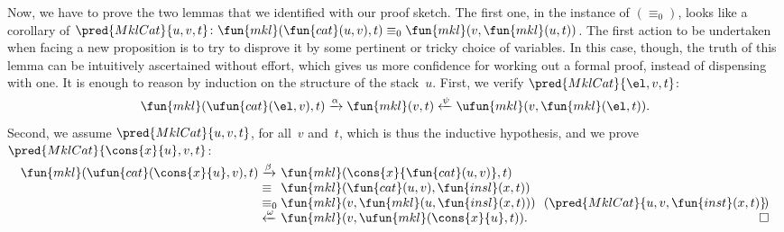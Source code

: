 Now, we have to prove the two lemmas that we identified with our proof
sketch. The first one, in the instance of \((\equiv_0)\), looks like a
corollary of \(\pred{MklCat}{u,v,t}
\colon \fun{mkl}(\fun{cat}(u,v),t) \equiv_0
\fun{mkl}(v,\fun{mkl}(u,t))\). The first action to be undertaken when
facing a new proposition is to try to disprove it by some pertinent or
tricky choice of variables. In this case, though, the truth of this
lemma can be intuitively ascertained without effort, which gives us
more confidence for working out a formal proof, instead of dispensing
with one. It is enough to reason by induction on the structure of the
stack~\(u\). First, we verify \(\pred{MklCat}{\el,v,t}\):
\begin{equation*}
\fun{mkl}(\ufun{cat}(\el,v),t)
  \xrightarrow{\smash{\alpha}} \fun{mkl}(v,t)
  \xleftarrow{\smash{\psi}} \ufun{mkl}(v,\fun{mkl}(\el,t)).
\end{equation*}
Second, we assume \(\pred{MklCat}{u,v,t}\), for all~\(v\) and~\(t\),
which is thus the inductive hypothesis, and we prove
\(\pred{MklCat}{\cons{x}{u},v,t}\):
\begin{equation*}
  \begin{array}{@{}r@{\;}l@{\;}l@{\quad}r@{}}
  \fun{mkl}(\ufun{cat}(\cons{x}{u},v),t)
& \xrightarrow{\smash{\beta}} &
  \fun{mkl}(\cons{x}{\fun{cat}(u,v)},t)\\
& \equiv &
  \fun{mkl}(\fun{cat}(u,v),\fun{insl}(x,t))\\
& \equiv_0 & \fun{mkl}(v,\fun{mkl}(u,\fun{insl}(x,t)))
         & \!\!(\pred{MklCat}{u,v,\fun{inst}(x,t)}\!)\\
& \xleftarrow{\smash{\omega}} &
  \fun{mkl}(v,\ufun{mkl}(\cons{x}{u},t)). & \hfill\Box
\end{array}
\end{equation*}

